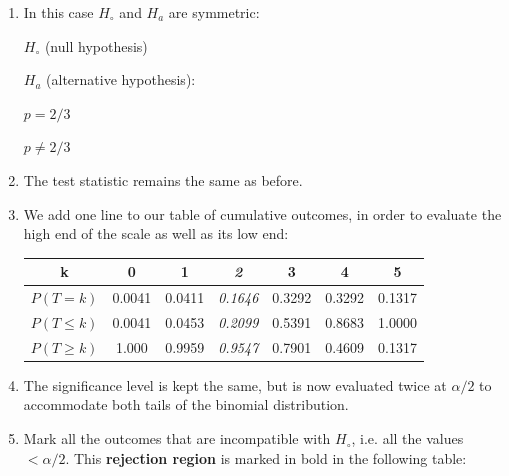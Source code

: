 \begin{enumerate}

\item In this case $H_\circ$ and $H_a$ are symmetric:\medskip

\noindent\begin{minipage}{.4\textwidth}
  $H_\circ$ (null hypothesis)
  
  \vspace{1em}
  
  $H_a$ (alternative hypothesis):
\end{minipage}
\begin{minipage}{.2\textwidth}
\end{minipage}
\begin{minipage}{.2\textwidth}
  $p=2/3$
  
  \vspace{1em}
  
  ${p}\neq{2/3}$
\end{minipage}
\begin{minipage}{.2\textwidth}
\end{minipage}\medskip

\item The test statistic remains the same as before.

\item We add one line to our table of cumulative outcomes, in order to
  evaluate the high end of the scale as well as its low end:

  \begin{center}
    \begin{tabular}{ccccccc}
      k & 0 & 1 & \textit{2} & 3 & 4 & 5 \\ \hline
      $P(T=k)$ & 0.0041 & 0.0411 & \textit{0.1646} & 0.3292 & 0.3292 & 0.1317 \\
      $P({T}\leq{k})$ & 0.0041 & 0.0453 & \textit{0.2099} &
      0.5391 & 0.8683 & 1.0000 \\
      $P({T}\geq{k})$ & 1.000 & 0.9959 & \textit{0.9547} &
      0.7901 & 0.4609 & 0.1317
    \end{tabular}
  \end{center}
  
\item The significance level is kept the same, but is now evaluated
  twice at $\alpha/2$ to accommodate both tails of the binomial
  distribution.

\item Mark all the outcomes that are incompatible with $H_\circ$,
  i.e. all the values $<\alpha/2$.  This \textbf{rejection region} is
  marked in bold in the following table:


\end{enumerate}
